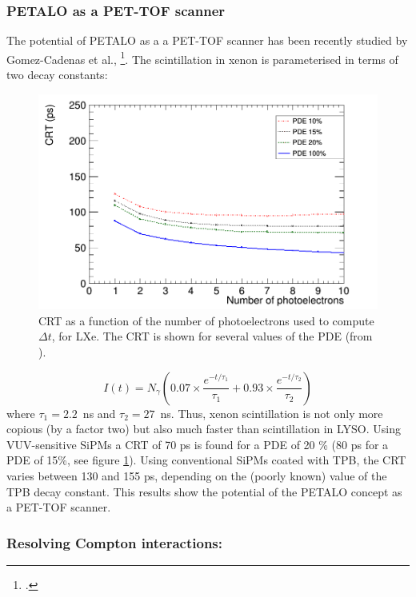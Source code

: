 \subsubsection*{PETALO as a PET-TOF scanner}
The potential of PETALO as a a PET-TOF scanner has been recently studied by Gomez-Cadenas et al.,  \footcite{PetaloTOF}. The scintillation in xenon is parameterised in terms of two decay constants:

 \begin{figure}[!bhtp]
	\centering
	\includegraphics[scale=0.40]{img/lxe_noCher_avg_npe_phys.png}
	\caption{\label{fig.crt_avg_LXe} CRT as a function of the number of photoelectrons used to compute $\Delta t$, for LXe. The CRT is shown for several values of the PDE (from \cite{PetaloTOF}).}
\end{figure}

\begin{equation}
I(t) = N_\gamma (0.07 \times \frac{e^{-t/\tau_1}}{\tau_1} + 0.93 \times \frac{e^{-t/\tau_2}}{\tau_2})
\label{eq.scint}
\end{equation}
where $\tau_1 = 2.2$~ns and $\tau_2 = 27$~ns. Thus, xenon scintillation is not only more copious (by a factor two) but also much faster than scintillation in LYSO. Using VUV-sensitive SiPMs a CRT of 70 ps is found for a PDE of 20 \% (80 ps for a PDE of 15\%, see figure \ref{fig.crt_avg_LXe}). Using conventional SiPMs coated with TPB, the CRT varies between 130 and 155 ps, depending on the (poorly known) value of the TPB decay constant. This results show the
potential of the PETALO concept as a PET-TOF scanner.  

\subsubsection*{Resolving Compton interactions:}

